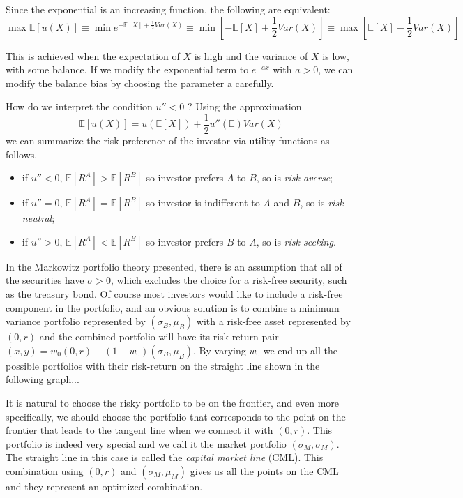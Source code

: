 Since the exponential is an increasing function, the following are equivalent:
\begin{equation*}
  \max \mathbb{E}[u(X)] \equiv \min e^{-\mathbb{E}[X]+ \frac{1}{2}Var(X)} \equiv \min\left[-\mathbb{E}[X] + \frac{1}{2}Var(X)\right] \equiv \max\left[\mathbb{E}[X] - \frac{1}{2}Var(X)\right]
\end{equation*}

This is achieved when the expectation of $X$ is high and the variance of $X$ is low, with some balance. If we modify the exponential term to $e^{-ax}$ with $a > 0$, we can
modify the balance bias by choosing the parameter a carefully.

How do we interpret the condition $u''<0$ ? Using the approximation
\begin{equation*}
  \mathbb{E}[u(X)] = u (\mathbb{E}[X]) + \frac{1}{2}u''(\mathbb{E})Var(X)
\end{equation*}
we can summarize the risk preference of the investor via utility functions as follows.
\begin{itemize}
\item if $u'' < 0$, $\mathbb{E}[R^A] > \mathbb{E}[R^B]$ so investor prefers $A$ to $B$, so is \emph{risk-averse};
\item if $u'' = 0$, $\mathbb{E}[R^A] = \mathbb{E}[R^B]$ so investor is indifferent to $A$ and $B$, so is \emph{risk-neutral};
\item if $u'' > 0$, $\mathbb{E}[R^A] < \mathbb{E}[R^B]$ so investor prefers $B$ to $A$, so is \emph{risk-seeking}.
\end{itemize}

In the Markowitz portfolio theory presented, there is an assumption that all of the securities have $\sigma > 0$, which excludes the choice for a risk-free security, such
as the treasury bond. Of course most investors would like to include a risk-free component in the portfolio, and an obvious solution is to combine a minimum
variance portfolio represented by $(\sigma_B, \mu_B)$ with a risk-free asset represented by $(0, r)$ and the combined portfolio will have its risk-return pair
$(x, y) = w_0(0, r) + (1-w_0)(\sigma_B, \mu_B)$.
By varying $w_0$ we end up all the possible portfolios with their risk-return on the straight line shown in the following graph...

It is natural to choose the risky portfolio to be on the frontier, and even more specifically, we should choose the portfolio that corresponds to the point on the
frontier that leads to the tangent line when we connect it with $(0, r)$. This portfolio is indeed very special and we call it the market portfolio $(\sigma_M, \sigma_M)$.
The straight line in this case is called the \emph{capital market line} (CML). This combination using $(0, r)$ and $(\sigma_M, \mu_M)$ gives us all the points on the CML and they represent an optimized combination.

